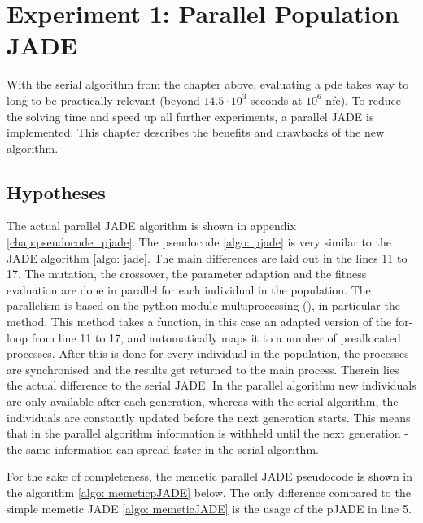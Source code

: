 \documentclass[./\jobname.tex]{subfiles}
\begin{document}
\section {Experiment 1: Parallel Population JADE}
\label{chap:experimet_1}

With the serial algorithm from the chapter above, evaluating a \gls{pde} takes way to long to be practically relevant (beyond $14.5 \cdot 10^3$ seconds at $10^6$ \gls{nfe}). To reduce the solving time and speed up all further experiments, a parallel JADE is implemented. This chapter describes the benefits and drawbacks of the new algorithm.  

\subsection{Hypotheses}
The actual parallel JADE algorithm is shown in appendix \ref{chap:pseudocode_pjade}. The pseudocode \ref{algo: pjade} is very similar to the JADE algorithm \ref{algo: jade}. The main differences are laid out in the lines 11 to 17. The mutation, the crossover, the parameter adaption and the fitness evaluation are done in parallel for each individual in the population. The parallelism is based on the python module multiprocessing (\cite{python_standard_library_multiprocessing_2020}), in particular the  method. This method takes a function, in this case an adapted version of the for-loop from line 11 to 17, and automatically maps it to a number of preallocated processes. After this is done for every individual in the population, the processes are synchronised and the results get returned to the main process. Therein lies the actual difference to the serial JADE. In the parallel algorithm new individuals are only available after each generation, whereas with the serial algorithm, the individuals are constantly updated before the next generation starts. This means that in the parallel algorithm information is withheld until the next generation - the same information can spread faster in the serial algorithm.  

For the sake of completeness, the memetic parallel JADE pseudocode is shown in the algorithm \ref{algo: memeticpJADE} below. The only difference compared to the simple memetic JADE \ref{algo: memeticJADE} is the usage of the pJADE in line 5. 

\begin{algorithm}[h]
	\SetAlgoNoLine
	\DontPrintSemicolon
	\label{algo: memeticpJADE}
\end{algorithm}
\end{document}

